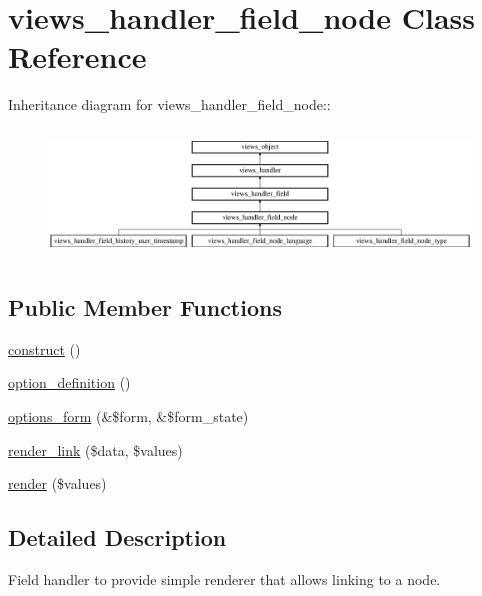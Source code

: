 \hypertarget{classviews__handler__field__node}{
\section{views\_\-handler\_\-field\_\-node Class Reference}
\label{classviews__handler__field__node}
}
Inheritance diagram for views\_\-handler\_\-field\_\-node::\begin{figure}[H]
\begin{center}
\leavevmode
\includegraphics[height=3.44403cm]{classviews__handler__field__node}
\end{center}
\end{figure}
\subsection*{Public Member Functions}
\begin{CompactItemize}
\item 
\hyperlink{classviews__handler__field__node_70404545ab178e131881fa5c5edd4b87}{construct} ()
\item 
\hyperlink{classviews__handler__field__node_c2daf04495ea792ad0dd60c864f3a77e}{option\_\-definition} ()
\item 
\hyperlink{classviews__handler__field__node_f3d8a04be282a20079ea4fb82e768910}{options\_\-form} (\&\$form, \&\$form\_\-state)
\item 
\hyperlink{classviews__handler__field__node_0ea7eeac3500e011ae0a83e67f56508d}{render\_\-link} (\$data, \$values)
\item 
\hyperlink{classviews__handler__field__node_fe7681e1188ad74ce9b604ad3ba864c0}{render} (\$values)
\end{CompactItemize}


\subsection{Detailed Description}
Field handler to provide simple renderer that allows linking to a node. 

